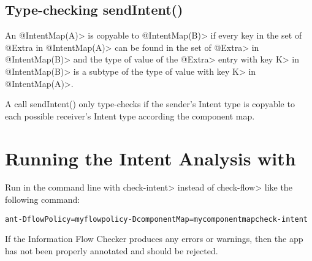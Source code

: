 \subsection{Type-checking sendIntent()}
An \<@IntentMap(A)> is copyable to \<@IntentMap(B)> if every key in the set of
@Extra in \<@IntentMap(A)> can be found in the set of \<@Extra> in
\<@IntentMap(B)> and the type of value of the \<@Extra> entry with key \<K> in
\<@IntentMap(B)> is a subtype of the type of value with key \<K> in
\<@IntentMap(A)>.


A call sendIntent() only type-checks if the sender's Intent type is copyable to
each possible receiver's Intent type according the component map. 

\section{Running the Intent Analysis with \TheFlowChecker{}}

Run \theFlowChecker{} in the command line with \<check-intent> instead of
\<check-flow> like the following command: 


\begin{alltt}
ant -DflowPolicy=myflowpolicy -DcomponentMap=mycomponentmap check-intent
\end{alltt}

If the Information Flow Checker produces any errors or warnings, then the app
has not been properly annotated and should be rejected.


